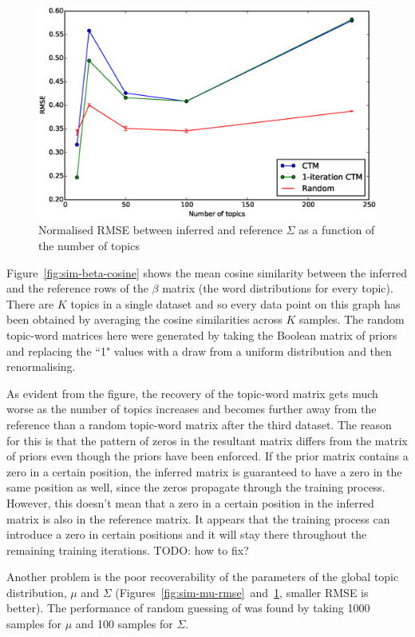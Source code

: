 \documentclass[12pt,a4paper,twoside,openright]{report}
\begin{document}
\begin{figure}[!htb]
\includegraphics[width=\textwidth]{sim-sigma-rmse.eps}
\caption{Normalised RMSE between inferred and reference $\Sigma$ as a function of the number of topics}
\label{fig:sim-sigma-rmse}
\end{figure}

Figure~\ref{fig:sim-beta-cosine} shows the mean cosine similarity between the inferred and the reference rows of the $\beta$ matrix (the word distributions for every topic). There are $K$ topics in a single dataset and so every data point on this graph has been obtained by averaging the cosine similarities across $K$ samples. The random topic-word matrices here were generated by taking the Boolean matrix of priors and replacing the ``1" values with a draw from a uniform distribution and then renormalising.

As evident from the figure, the recovery of the topic-word matrix gets much worse as the number of topics increases and becomes further away from the reference than a random topic-word matrix after the third dataset. The reason for this is that the pattern of zeros in the resultant matrix differs from the matrix of priors even though the priors have been enforced. If the prior matrix contains a zero in a certain position, the inferred matrix is guaranteed to have a zero in the same position as well, since the zeros propagate through the training process. However, this doesn't mean that a zero in a certain position in the inferred matrix is also in the reference matrix. It appears that the training process can introduce a zero in certain positions and it will stay there throughout the remaining training iterations. TODO: how to fix?

Another problem is the poor recoverability of the parameters of the global topic distribution, $\mu$ and $\Sigma$ (Figures~\ref{fig:sim-mu-rmse}~and~\ref{fig:sim-sigma-rmse}, smaller RMSE is better). The performance of random guessing of was found by taking 1000 samples for $\mu$ and 100 samples for $\Sigma$.
\end{document}
